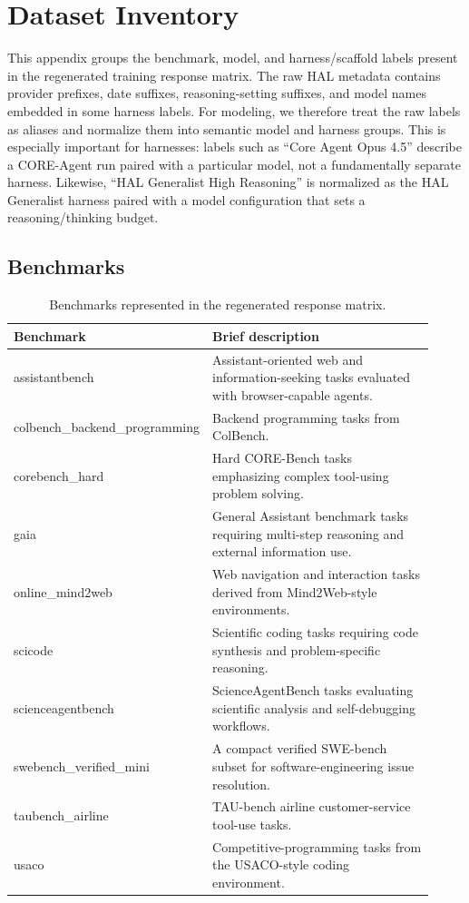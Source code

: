 \section{Dataset Inventory}
\label{app:dataset-inventory}

This appendix groups the benchmark, model, and harness/scaffold labels present in the regenerated training response matrix. The raw HAL metadata contains provider prefixes, date suffixes, reasoning-setting suffixes, and model names embedded in some harness labels. For modeling, we therefore treat the raw labels as aliases and normalize them into semantic model and harness groups. This is especially important for harnesses: labels such as ``Core Agent Opus 4.5'' describe a CORE-Agent run paired with a particular model, not a fundamentally separate harness. Likewise, ``HAL Generalist High Reasoning'' is normalized as the HAL Generalist harness paired with a model configuration that sets a reasoning/thinking budget.

\subsection{Benchmarks}

\begin{table}[h]
\centering
\small
\begin{tabular}{>{\raggedright\arraybackslash}p{0.34\linewidth}>{\raggedright\arraybackslash}p{0.58\linewidth}}
\toprule
Benchmark & Brief description \\
\midrule
assistantbench & Assistant-oriented web and information-seeking tasks evaluated with browser-capable agents. \\
colbench\_backend\_programming & Backend programming tasks from ColBench. \\
corebench\_hard & Hard CORE-Bench tasks emphasizing complex tool-using problem solving. \\
gaia & General Assistant benchmark tasks requiring multi-step reasoning and external information use. \\
online\_mind2web & Web navigation and interaction tasks derived from Mind2Web-style environments. \\
scicode & Scientific coding tasks requiring code synthesis and problem-specific reasoning. \\
scienceagentbench & ScienceAgentBench tasks evaluating scientific analysis and self-debugging workflows. \\
swebench\_verified\_mini & A compact verified SWE-bench subset for software-engineering issue resolution. \\
taubench\_airline & TAU-bench airline customer-service tool-use tasks. \\
usaco & Competitive-programming tasks from the USACO-style coding environment. \\
\bottomrule
\end{tabular}
\caption{Benchmarks represented in the regenerated response matrix.}
\end{table}

